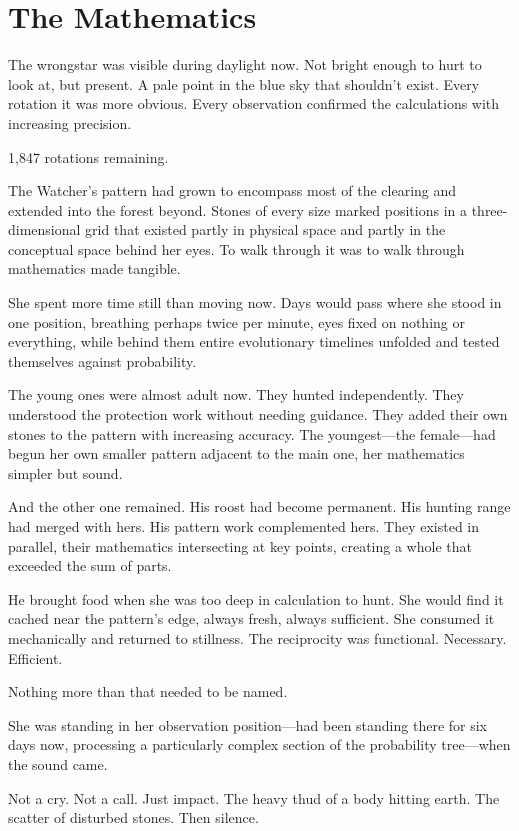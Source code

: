 \chapter{The Mathematics}
\label{ch:07}


The wrongstar was visible during daylight now. Not bright enough to hurt to look at, but present. A pale point in the blue sky that shouldn't exist. Every rotation it was more obvious. Every observation confirmed the calculations with increasing precision.

1,847 rotations remaining.

The Watcher's pattern had grown to encompass most of the clearing and extended into the forest beyond. Stones of every size marked positions in a three-dimensional grid that existed partly in physical space and partly in the conceptual space behind her eyes. To walk through it was to walk through mathematics made tangible.

She spent more time still than moving now. Days would pass where she stood in one position, breathing perhaps twice per minute, eyes fixed on nothing or everything, while behind them entire evolutionary timelines unfolded and tested themselves against probability.

The young ones were almost adult now. They hunted independently. They understood the protection work without needing guidance. They added their own stones to the pattern with increasing accuracy. The youngest—the female—had begun her own smaller pattern adjacent to the main one, her mathematics simpler but sound.

And the other one remained. His roost had become permanent. His hunting range had merged with hers. His pattern work complemented hers. They existed in parallel, their mathematics intersecting at key points, creating a whole that exceeded the sum of parts.

He brought food when she was too deep in calculation to hunt. She would find it cached near the pattern's edge, always fresh, always sufficient. She consumed it mechanically and returned to stillness. The reciprocity was functional. Necessary. Efficient.

Nothing more than that needed to be named.

\scenebreak

She was standing in her observation position—had been standing there for six days now, processing a particularly complex section of the probability tree—when the sound came.

Not a cry. Not a call. Just impact. The heavy thud of a body hitting earth. The scatter of disturbed stones. Then silence.

